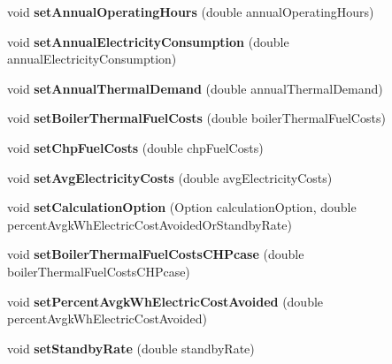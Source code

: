 \begin{DoxyCompactItemize}
void {\bfseries set\+Annual\+Operating\+Hours} (double annual\+Operating\+Hours)
\item 
\mbox{\label{class_c_h_p_a306aa3de555bb7dbd79e7aeb1658713e}} 
void {\bfseries set\+Annual\+Electricity\+Consumption} (double annual\+Electricity\+Consumption)
\item 
\mbox{\label{class_c_h_p_aa7abaae6cf4d62059eff750498d70076}} 
void {\bfseries set\+Annual\+Thermal\+Demand} (double annual\+Thermal\+Demand)
\item 
\mbox{\label{class_c_h_p_a13c93cd6b6bba4d52b2f8fd10638724e}} 
void {\bfseries set\+Boiler\+Thermal\+Fuel\+Costs} (double boiler\+Thermal\+Fuel\+Costs)
\item 
\mbox{\label{class_c_h_p_a419c9eaf0ad6009bb3dd753e4b1dd63b}} 
void {\bfseries set\+Chp\+Fuel\+Costs} (double chp\+Fuel\+Costs)
\item 
\mbox{\label{class_c_h_p_ad953f7558bf3a38816e29d9ffaf6273c}} 
void {\bfseries set\+Avg\+Electricity\+Costs} (double avg\+Electricity\+Costs)
\item 
\mbox{\label{class_c_h_p_abfa71c23fa4b58c03c3337b57ba0d56d}} 
void {\bfseries set\+Calculation\+Option} (Option calculation\+Option, double percent\+Avgk\+Wh\+Electric\+Cost\+Avoided\+Or\+Standby\+Rate)
\item 
\mbox{\label{class_c_h_p_a319f1e915035b2dface2dbad67c65017}} 
void {\bfseries set\+Boiler\+Thermal\+Fuel\+Costs\+C\+H\+Pcase} (double boiler\+Thermal\+Fuel\+Costs\+C\+H\+Pcase)
\item 
\mbox{\label{class_c_h_p_a002b9e405c3a1777b306430cd1bbbec3}} 
void {\bfseries set\+Percent\+Avgk\+Wh\+Electric\+Cost\+Avoided} (double percent\+Avgk\+Wh\+Electric\+Cost\+Avoided)
\item 
\mbox{\label{class_c_h_p_ac25d489d5d3e336f7286c0124f81d3c5}} 
void {\bfseries set\+Standby\+Rate} (double standby\+Rate)
\item 
\mbox{\label{class_c_h_p_a6f80ede27800dfdeb0493e0501823fde}} 

\end{DoxyCompactItemize}
